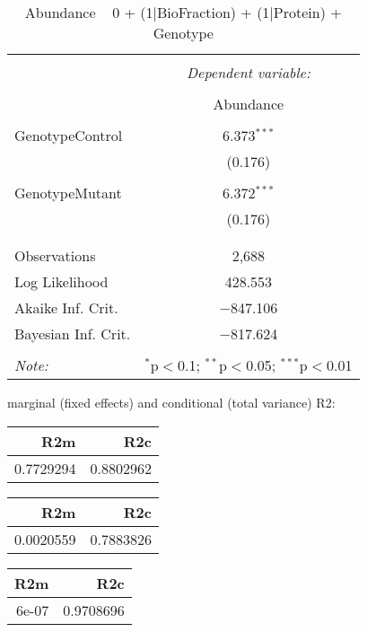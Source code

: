 \documentclass[11pt]{report}
\begin{document}
\begin{table}[!htbp] \centering 
  \caption{Abundance ~ 0 + (1|BioFraction) + (1|Protein) + Genotype} 
  \label{} 
\begin{tabular}{@{\extracolsep{5pt}}lc} 
\\[-1.8ex]\hline 
\hline \\[-1.8ex] 
 & \multicolumn{1}{c}{\textit{Dependent variable:}} \\ 
\cline{2-2} 
\\[-1.8ex] & Abundance \\ 
\hline \\[-1.8ex] 
 GenotypeControl & 6.373$^{***}$ \\ 
  & (0.176) \\ 
  & \\ 
 GenotypeMutant & 6.372$^{***}$ \\ 
  & (0.176) \\ 
  & \\ 
\hline \\[-1.8ex] 
Observations & 2,688 \\ 
Log Likelihood & 428.553 \\ 
Akaike Inf. Crit. & $-$847.106 \\ 
Bayesian Inf. Crit. & $-$817.624 \\ 
\hline 
\hline \\[-1.8ex] 
\textit{Note:}  & \multicolumn{1}{r}{$^{*}$p$<$0.1; $^{**}$p$<$0.05; $^{***}$p$<$0.01} \\ 
\end{tabular} 
\end{table} 
marginal (fixed effects) and conditional (total variance) R2:

\begin{tabular}{r|r}
\hline
R2m & R2c\\
\hline
0.7729294 & 0.8802962\\
\hline
\end{tabular}

\begin{tabular}{r|r}
\hline
R2m & R2c\\
\hline
0.0020559 & 0.7883826\\
\hline
\end{tabular}

\begin{tabular}{r|r}
\hline
R2m & R2c\\
\hline
6e-07 & 0.9708696\\
\hline
\end{tabular}
\end{document}
